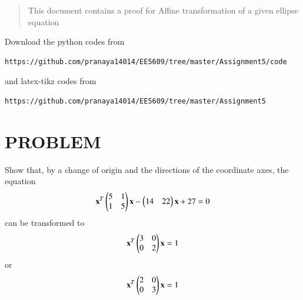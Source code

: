 \documentclass[journal,12pt,twocolumn]{IEEEtran}
\begin{document}
%
\begin{abstract}
This document contains a proof for Affine transformation of a given ellipse equation
\end{abstract}
Download the python codes from 
%
\begin{lstlisting}
https://github.com/pranaya14014/EE5609/tree/master/Assignment5/code
\end{lstlisting}
%
and latex-tikz codes from 
%
\begin{lstlisting}
https://github.com/pranaya14014/EE5609/tree/master/Assignment5
\end{lstlisting}
%
\section{PROBLEM}
Show that, by a change of origin and the directions of the coordinate axes, the equation
\begin{align}
\mathbf{x}^T\begin{pmatrix}5&1\\1&5\end{pmatrix}\mathbf{x}-\begin{pmatrix}14&22\end{pmatrix}\mathbf{x}+27 = 0\label{eq:0}
\end{align}
can be transformed to
\begin{align}
\mathbf{x}^T\begin{pmatrix}3&0\\0&2\end{pmatrix}\mathbf{x}=1 \label{eq:0.1}
\end{align}
or
\begin{align}
\mathbf{x}^T\begin{pmatrix}2&0\\0&3\end{pmatrix}\mathbf{x}=1 \label{eq:0.2}
\end{align}
\end{document}
